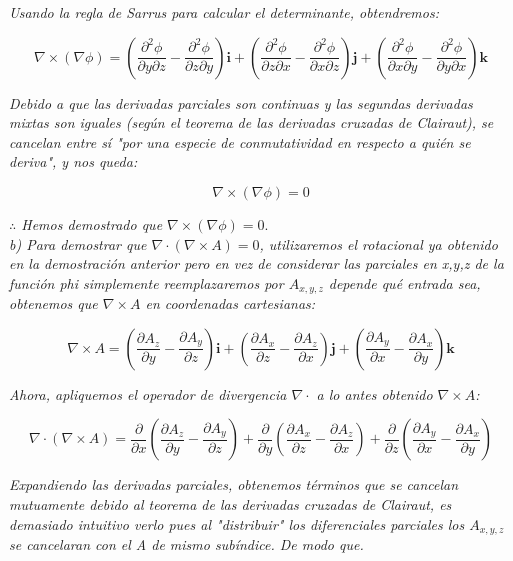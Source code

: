 \documentclass{article}
\begin{document}
\textit{Usando la regla de Sarrus para calcular el determinante, obtendremos:}

$$
\nabla \times (\nabla \phi) = \left( \frac{\partial^2 \phi}{\partial y \partial z} - \frac{\partial^2 \phi}{\partial z \partial y} \right) \mathbf{i} + \left( \frac{\partial^2 \phi}{\partial z \partial x} - \frac{\partial^2 \phi}{\partial x \partial z} \right) \mathbf{j} + \left( \frac{\partial^2 \phi}{\partial x \partial y} - \frac{\partial^2 \phi}{\partial y \partial x} \right) \mathbf{k}
$$

\textit{Debido a que las derivadas parciales son continuas y las segundas derivadas mixtas son iguales (según el teorema de las derivadas cruzadas de Clairaut), se cancelan entre sí "por una especie de conmutatividad en respecto a quién se deriva", y nos queda:}

$$
\nabla \times (\nabla \phi) = 0
$$

\textit{$\therefore$ Hemos demostrado que $ \nabla \times (\nabla \phi) = 0 $}. \\

\textit{b) Para demostrar que $ \nabla \cdot (\nabla \times A) = 0 $, utilizaremos el rotacional ya obtenido en la demostración anterior pero en vez de considerar las parciales en x,y,z de la función phi simplemente reemplazaremos por $A_{x,y,z}$ depende qué entrada sea, obtenemos que $ \nabla \times A $ en coordenadas cartesianas:}

$$
\nabla \times A = \left( \frac{\partial A_z}{\partial y} - \frac{\partial A_y}{\partial z} \right) \mathbf{i} + \left( \frac{\partial A_x}{\partial z} - \frac{\partial A_z}{\partial x} \right) \mathbf{j} + \left( \frac{\partial A_y}{\partial x} - \frac{\partial A_x}{\partial y} \right) \mathbf{k}
$$

\textit{Ahora, apliquemos el operador de divergencia $ \nabla \cdot $ a lo antes obtenido $ \nabla \times A $:}

$$
\nabla \cdot (\nabla \times A) = \frac{\partial}{\partial x} \left( \frac{\partial A_z}{\partial y} - \frac{\partial A_y}{\partial z} \right) + \frac{\partial}{\partial y} \left( \frac{\partial A_x}{\partial z} - \frac{\partial A_z}{\partial x} \right) + \frac{\partial}{\partial z} \left( \frac{\partial A_y}{\partial x} - \frac{\partial A_x}{\partial y} \right)
$$

\textit{Expandiendo las derivadas parciales, obtenemos términos que se cancelan mutuamente debido al teorema de las derivadas cruzadas de Clairaut, es demasiado intuitivo verlo pues al "distribuir" los diferenciales parciales los $A_{x,y,z}$ se cancelaran con el A de mismo subíndice. De modo que.}
\end{document}
